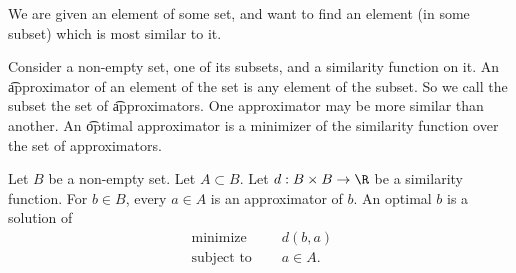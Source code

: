 

We are given an element of some set, and want to find an element (in some subset) which is most similar to it.


Consider a non-empty set, one of its subsets, and a similarity function on it.
An \t{approximator} of an element of the set is any element of the subset.
So we call the subset the set of \t{approximators}.
One approximator may be more similar than another.
An \t{optimal} approximator is a minimizer of the similarity function over the set of approximators.


Let $B$ be a non-empty set.
Let $A \subset B$.
Let $d: B \times B \to \R$ be a similarity function.
For $b \in B$, every $a \in A$ is an approximator of $b$.
An optimal $b$ is a solution of
\[
\begin{aligned}
  \text{ minimize }   & \quad d(b, a) \\
  \text{ subject to } & \quad a \in A.
\end{aligned}
\]

\blankpage